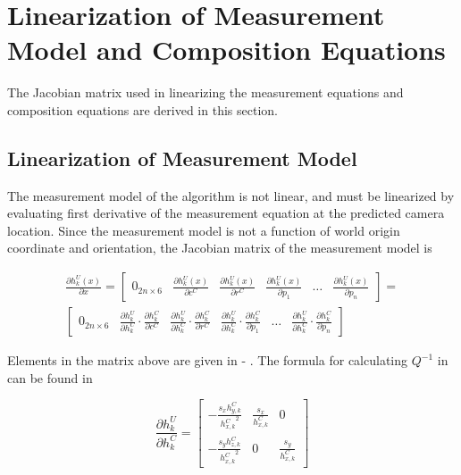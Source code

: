 \chapter{Linearization of Measurement Model and Composition Equations}\label{ch:appendix3}
The Jacobian matrix used in linearizing the measurement equations and
composition equations are derived in this section. 

\section{Linearization of Measurement Model}
\label{sec:jac_measurement}
The measurement
model of the algorithm is not linear, and must be linearized by
evaluating first derivative of the measurement equation at the
predicted camera location. Since the measurement model is not a
function of world origin coordinate and orientation, the Jacobian
matrix of the measurement model is

\begin{multline}
\frac{\partial h_{k}^{U}(x)}{\partial x}=
\begin{bmatrix}
0_{2n\times 6} & \frac{\partial h_{k}^{U}(x)}{\partial c^{C}} &
\frac{\partial h_{k}^{U}(x)}{\partial r^{C}} &
\frac{\partial h_{k}^{U}(x)}{\partial p_{1}} & 
\ldots & \frac{\partial h_{k}^{U}(x)}{\partial p_{n}}
\end{bmatrix} = \\ \begin{bmatrix}
0_{2n\times 6} & 
\frac{\partial h_{k}^{U}}{\partial h_{k}^{C}} \cdot 
\frac{\partial h_{k}^{C}}{\partial c^{C}} & 
\frac{\partial h_{k}^{U}}{\partial h_{k}^{C}} \cdot 
\frac{\partial h_{k}^{C}}{\partial r^{C}} & 
\frac{\partial h_{k}^{U}}{\partial h_{k}^{C}} \cdot 
\frac{\partial h_{k}^{C}}{\partial p_{1}} & 
\ldots & 
\frac{\partial h_{k}^{U}}{\partial h_{k}^{C}} \cdot 
\frac{\partial h_{k}^{C}}{\partial p_{n}}
\end{bmatrix}
\end{multline}


Elements in the matrix above are given in - . The formula for 
calculating $Q^{-1}$ in can be found in 

\begin{equation}
\frac{\partial h_{k}^{U}}{\partial h_{k}^{C}}= \begin{bmatrix}
-\frac{s_{x}h_{y,k}^{C}}{{h_{x,k}^{C}}^{2}} & \frac{s_{x}}{h_{x,k}^{C}} & 0 \\
-\frac{s_{y}h_{z,k}^{C}}{{h_{x,k}^{C}}^{2}} & 0 & \frac{s_{y}}{h_{x,k}^{C}}
\end{bmatrix}
\end{equation}

